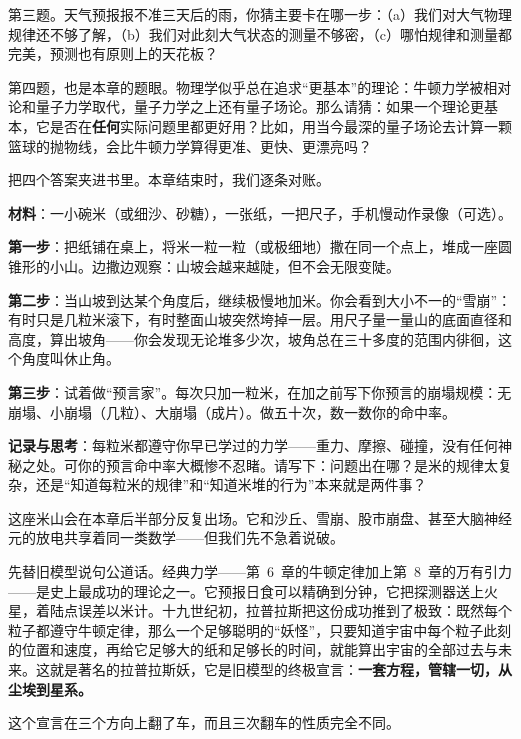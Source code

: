 第三题。天气预报报不准三天后的雨，你猜主要卡在哪一步：（a）我们对大气物理规律还不够了解，（b）我们对此刻大气状态的测量不够密，（c）哪怕规律和测量都完美，预测也有原则上的天花板？

第四题，也是本章的题眼。物理学似乎总在追求“更基本”的理论：牛顿力学被相对论和量子力学取代，量子力学之上还有量子场论。那么请猜：如果一个理论更基本，它是否在\textbf{任何}实际问题里都更好用？比如，用当今最深的量子场论去计算一颗篮球的抛物线，会比牛顿力学算得更准、更快、更漂亮吗？

把四个答案夹进书里。本章结束时，我们逐条对账。


\begin{experiment}[一座会自己决定何时崩塌的米山]
\textbf{材料}：一小碗米（或细沙、砂糖），一张纸，一把尺子，手机慢动作录像（可选）。

\textbf{第一步}：把纸铺在桌上，将米一粒一粒（或极细地）撒在同一个点上，堆成一座圆锥形的小山。边撒边观察：山坡会越来越陡，但不会无限变陡。

\textbf{第二步}：当山坡到达某个角度后，继续极慢地加米。你会看到大小不一的“雪崩”：有时只是几粒米滚下，有时整面山坡突然垮掉一层。用尺子量一量山的底面直径和高度，算出坡角——你会发现无论堆多少次，坡角总在三十多度的范围内徘徊，这个角度叫休止角。

\textbf{第三步}：试着做“预言家”。每次只加一粒米，在加之前写下你预言的崩塌规模：无崩塌、小崩塌（几粒）、大崩塌（成片）。做五十次，数一数你的命中率。

\textbf{记录与思考}：每粒米都遵守你早已学过的力学——重力、摩擦、碰撞，没有任何神秘之处。可你的预言命中率大概惨不忍睹。请写下：问题出在哪？是米的规律太复杂，还是“知道每粒米的规律”和“知道米堆的行为”本来就是两件事？
\end{experiment}

这座米山会在本章后半部分反复出场。它和沙丘、雪崩、股市崩盘、甚至大脑神经元的放电共享着同一类数学——但我们先不急着说破。


先替旧模型说句公道话。经典力学——第~6~章的牛顿定律加上第~8~章的万有引力——是史上最成功的理论之一。它预报日食可以精确到分钟，它把探测器送上火星，着陆点误差以米计。十九世纪初，拉普拉斯把这份成功推到了极致：既然每个粒子都遵守牛顿定律，那么一个足够聪明的“妖怪”，只要知道宇宙中每个粒子此刻的位置和速度，再给它足够大的纸和足够长的时间，就能算出宇宙的全部过去与未来。这就是著名的拉普拉斯妖，它是旧模型的终极宣言：\textbf{一套方程，管辖一切，从尘埃到星系。}

这个宣言在三个方向上翻了车，而且三次翻车的性质完全不同。

